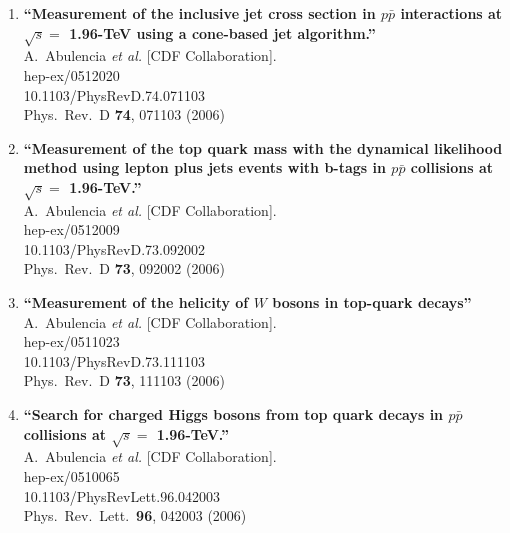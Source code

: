 \documentclass{article}
\begin{document}
\begin{enumerate}
\item%
{\bf ``Measurement of the inclusive jet cross section in $p\bar{p}$ interactions at $\sqrt{s} =$ 1.96-TeV using a cone-based jet algorithm.''}
  \\{}A.~Abulencia {\it et al.}  [CDF Collaboration].
  \\{}hep-ex/0512020
    \\{}10.1103/PhysRevD.74.071103
\\{}Phys.\ Rev.\ D {\bf 74}, 071103 (2006) %


\item%
{\bf ``Measurement of the top quark mass with the dynamical likelihood method using lepton plus jets events with b-tags in $p\bar{p}$ collisions at $\sqrt{s} =$ 1.96-TeV.''}
  \\{}A.~Abulencia {\it et al.}  [CDF Collaboration].
  \\{}hep-ex/0512009
    \\{}10.1103/PhysRevD.73.092002
\\{}Phys.\ Rev.\ D {\bf 73}, 092002 (2006) %


\item%
{\bf ``Measurement of the helicity of $W$ bosons in top-quark decays''}
  \\{}A.~Abulencia {\it et al.}  [CDF Collaboration].
  \\{}hep-ex/0511023
    \\{}10.1103/PhysRevD.73.111103
\\{}Phys.\ Rev.\ D {\bf 73}, 111103 (2006) %


\item%
{\bf ``Search for charged Higgs bosons from top quark decays in $p\bar{p}$ collisions at $\sqrt{s} =$ 1.96-TeV.''}
  \\{}A.~Abulencia {\it et al.}  [CDF Collaboration].
  \\{}hep-ex/0510065
    \\{}10.1103/PhysRevLett.96.042003
\\{}Phys.\ Rev.\ Lett.\  {\bf 96}, 042003 (2006) %



\end{enumerate}
\end{document}

